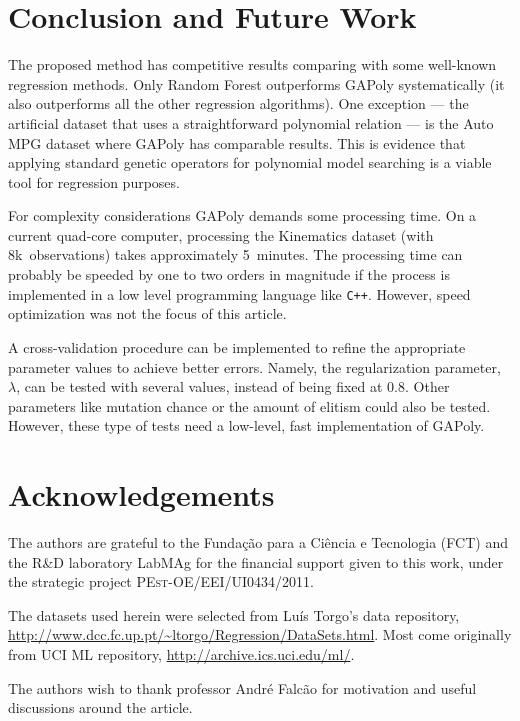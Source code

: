 \documentclass[draft,authoryear,3p,times,twocolumn]{elsarticle}
\begin{document}
\section{Conclusion and Future Work}

The proposed method has competitive results comparing with some well-known regression methods. Only Random Forest outperforms \ac{GAPoly} systematically (it also outperforms all the other regression algorithms). One exception --- the artificial dataset that uses a straightforward polynomial relation --- is the Auto MPG dataset where \ac{GAPoly} has comparable results. This is evidence that applying standard genetic operators for polynomial model searching is a viable tool for regression purposes.

For complexity considerations \ac{GAPoly} demands some processing time. On a current quad-core computer, processing the Kinematics dataset (with 8k~observations) takes approximately 5~minutes. The processing time can probably be speeded by one to two orders in magnitude if the process is implemented in a low level programming language like \texttt{C++}. However, speed optimization was not the focus of this article.

A cross-validation procedure can be implemented to refine the appropriate parameter values to achieve better errors. Namely, the regularization parameter, $\lambda$, can be tested with several values, instead of being fixed at $0.8$. Other parameters like mutation chance or the amount of elitism could also be tested. However, these type of tests need a low-level, fast implementation of \ac{GAPoly}.

\section*{Acknowledgements}

The authors are grateful to the Fundação para a Ciência e Tecnologia (FCT) and the  R\&D laboratory LabMAg for the financial support given to this work, under the strategic project \textsc{PEst-OE/EEI/UI0434/2011}.

The datasets used herein were selected from Luís Torgo's data  repository, \url{http://www.dcc.fc.up.pt/~ltorgo/Regression/DataSets.html}. Most come originally from UCI ML repository, \url{http://archive.ics.uci.edu/ml/}.

The authors wish to thank professor André Falcão for motivation and useful discussions around the article.




\end{document}
